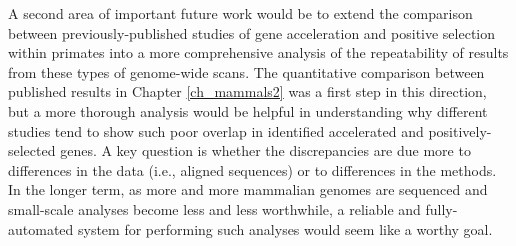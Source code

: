 A second area of important future work would be to extend the
comparison between previously-published studies of gene acceleration
and positive selection within primates into a more comprehensive
analysis of the repeatability of results from these types of
genome-wide scans. The quantitative comparison between published
results in Chapter \ref{ch_mammals2} was a first step in this
direction, but a more thorough analysis would be helpful in
understanding why different studies tend to show such poor overlap in
identified accelerated and positively-selected genes. A key question
is whether the discrepancies are due more to differences in the data
(i.e., aligned sequences) or to differences in the methods. In the
longer term, as more and more mammalian genomes are sequenced and
small-scale analyses become less and less worthwhile, a reliable and
fully-automated system for performing such analyses would seem like a
worthy goal.
